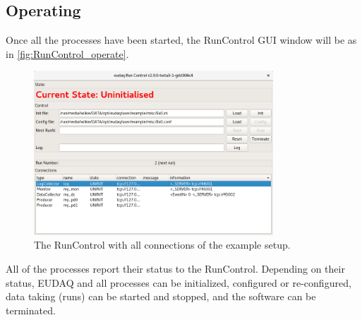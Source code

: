 \subsection{Operating}
Once all the processes have been started, the RunControl GUI window will be as in \autoref{fig:RunControl_operate}.
\begin{figure}[htb]
  \begin{center}
    \includegraphics[width=0.8\textwidth]{src/images/eurun_ui_connected}
    \caption{The RunControl with all connections of the example setup.}
    \label{fig:RunControl_operate}
  \end{center}
\end{figure}

All of the processes report their status to the RunControl.
Depending on their status, EUDAQ and all processes can be initialized, configured or re-configured, data taking (runs) can be started and stopped, and the software can be terminated.

